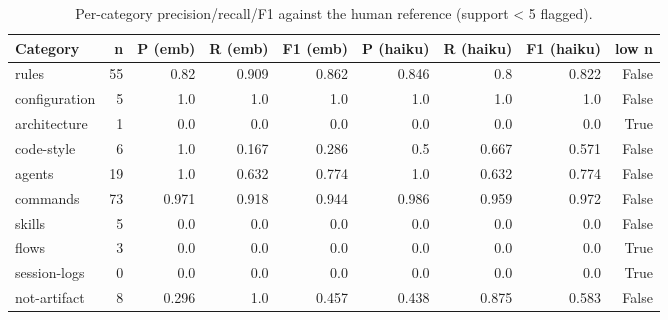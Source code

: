 \begin{table}[t]
\centering
\caption{Per-category precision/recall/F1 against the human reference (support < 5 flagged).}
\label{tab:per-category}
\begin{tabular}{lrrrrrrrr}
\toprule
Category & n & P (emb) & R (emb) & F1 (emb) & P (haiku) & R (haiku) & F1 (haiku) & low n \\
\midrule
rules & 55 & 0.82 & 0.909 & 0.862 & 0.846 & 0.8 & 0.822 & False \\
configuration & 5 & 1.0 & 1.0 & 1.0 & 1.0 & 1.0 & 1.0 & False \\
architecture & 1 & 0.0 & 0.0 & 0.0 & 0.0 & 0.0 & 0.0 & True \\
code-style & 6 & 1.0 & 0.167 & 0.286 & 0.5 & 0.667 & 0.571 & False \\
agents & 19 & 1.0 & 0.632 & 0.774 & 1.0 & 0.632 & 0.774 & False \\
commands & 73 & 0.971 & 0.918 & 0.944 & 0.986 & 0.959 & 0.972 & False \\
skills & 5 & 0.0 & 0.0 & 0.0 & 0.0 & 0.0 & 0.0 & False \\
flows & 3 & 0.0 & 0.0 & 0.0 & 0.0 & 0.0 & 0.0 & True \\
session-logs & 0 & 0.0 & 0.0 & 0.0 & 0.0 & 0.0 & 0.0 & True \\
not-artifact & 8 & 0.296 & 1.0 & 0.457 & 0.438 & 0.875 & 0.583 & False \\
\bottomrule
\end{tabular}
\end{table}
